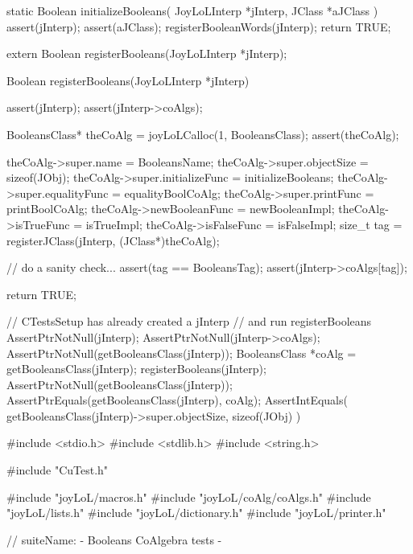 \stopCHeader

\startCCode
static Boolean initializeBooleans(
  JoyLoLInterp *jInterp,
  JClass   *aJClass
) {
  assert(jInterp);
  assert(aJClass);
  registerBooleanWords(jInterp);
  return TRUE;
}
\stopCCode

\startCHeader
extern Boolean registerBooleans(JoyLoLInterp *jInterp);
\stopCHeader
{}

\startCCode
Boolean registerBooleans(JoyLoLInterp *jInterp) {
  assert(jInterp);
  assert(jInterp->coAlgs);
  
  BooleansClass* theCoAlg
    = joyLoLCalloc(1, BooleansClass);
  assert(theCoAlg);
  
  theCoAlg->super.name           = BooleansName;
  theCoAlg->super.objectSize     = sizeof(JObj);
  theCoAlg->super.initializeFunc = initializeBooleans;
  theCoAlg->super.equalityFunc   = equalityBoolCoAlg;
  theCoAlg->super.printFunc      = printBoolCoAlg;
  theCoAlg->newBooleanFunc       = newBooleanImpl;
  theCoAlg->isTrueFunc           = isTrueImpl;
  theCoAlg->isFalseFunc          = isFalseImpl;
  size_t tag =
    registerJClass(jInterp, (JClass*)theCoAlg);
  
  // do a sanity check...
  assert(tag == BooleansTag);
  assert(jInterp->coAlgs[tag]);
   
  return TRUE;
}
\stopCCode


\startCTest
  // CTestsSetup has already created a jInterp
  // and run registerBooleans
  AssertPtrNotNull(jInterp);
  AssertPtrNotNull(jInterp->coAlgs);
  AssertPtrNotNull(getBooleansClass(jInterp));
  BooleansClass *coAlg = getBooleansClass(jInterp);
  registerBooleans(jInterp);
  AssertPtrNotNull(getBooleansClass(jInterp));
  AssertPtrEquals(getBooleansClass(jInterp), coAlg);
  AssertIntEquals(
    getBooleansClass(jInterp)->super.objectSize,
    sizeof(JObj)
  )
\stopCTest
\stopTestCase
\stopTestSuite

\starttyping
#include <stdio.h>
#include <stdlib.h>
#include <string.h>

#include "CuTest.h"

#include "joyLoL/macros.h"
#include "joyLoL/coAlg/coAlgs.h"
#include "joyLoL/lists.h"
#include "joyLoL/dictionary.h"
#include "joyLoL/printer.h"

// suiteName: - Booleans CoAlgebra tests -

